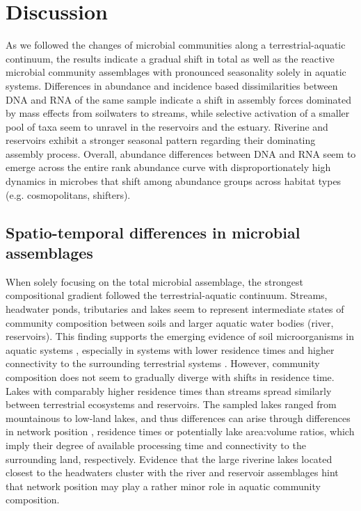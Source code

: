 \documentclass[12pt,a4paper]{article} %
\begin{document}
\section*{Discussion}
As we followed the changes of microbial communities along a terrestrial-aquatic continuum, the results indicate a gradual shift in total as well as the reactive microbial community assemblages with pronounced seasonality solely in aquatic systems. Differences in abundance and incidence based dissimilarities between DNA and RNA of the same sample indicate a shift in assembly forces dominated by mass effects from soilwaters to streams, while selective activation of a smaller pool of taxa seem to unravel in the reservoirs and the estuary. Riverine and reservoirs exhibit a stronger seasonal pattern regarding their dominating assembly process. Overall, abundance differences between DNA and RNA seem to emerge across the entire rank abundance curve with disproportionately high dynamics in microbes that shift among abundance groups across habitat types (e.g. cosmopolitans, shifters).

\subsection*{Spatio-temporal differences in microbial assemblages}
When solely focusing on the total microbial assemblage, the strongest compositional gradient followed the terrestrial-aquatic continuum. Streams, headwater ponds, tributaries and lakes seem to represent intermediate states of community composition between soils and larger aquatic water bodies (river, reservoirs). This finding supports the emerging evidence of soil microorganisms in aquatic systems \citep{Ruiz-Gonzalez2015, Hauptmann2016}, especially in systems with lower residence times and higher connectivity to the surrounding terrestrial systems \citep{Crump2012, Besemer2013}. However, community composition does not seem to gradually diverge with shifts in residence time. Lakes with comparably higher residence times than streams spread similarly between terrestrial ecosystems and reservoirs. The sampled lakes ranged from mountainous to low-land lakes, and thus differences can arise through differences in network position \citep{Carrara2013}, residence times \citep{Logue2010} or potentially lake area:volume ratios, which imply their degree of available processing time and connectivity to the surrounding land, respectively. Evidence that the large riverine lakes located closest to the headwaters cluster with the river and reservoir assemblages hint that network position may play a rather minor role in aquatic community composition.
\end{document}
